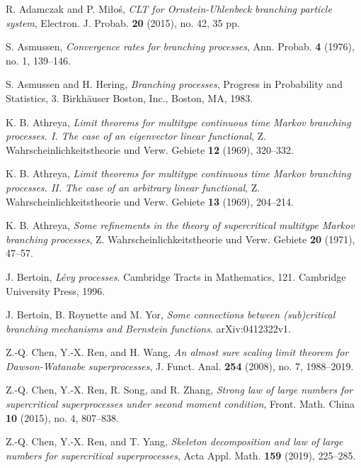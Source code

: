 \documentclass[EJP]{ejpecp} %
\begin{document}
\begin{thebibliography}{10}

  	R. Adamczak and P. Mi{\l}o\'{s}, 
  	\emph{C{LT} for {O}rnstein-{U}hlenbeck branching particle system},
  	Electron. J. Probab. \textbf{20} (2015), no. 42, 35 pp.

  	S. Asmussen, 
  	\emph{Convergence rates for branching processes},
  	Ann. Probab.  \textbf{4} (1976), no. 1, 139--146.

  	S. Asmussen and H. Hering, 
  	\emph{Branching processes},
  	Progress in Probability and Statistics, 3. Birkh\"{a}user Boston, Inc., Boston, MA, 1983.

  	K. B. Athreya,
  	\emph{Limit theorems for multitype continuous time {M}arkov branching processes. {I}. {T}he case of an eigenvector linear functional},
  	Z. Wahrscheinlichkeitstheorie und Verw. Gebiete \textbf{12} (1969), 320--332.

  	K. B. Athreya,
  	\emph{Limit theorems for multitype continuous time {M}arkov branching processes. {II}. {T}he case of an arbitrary linear functional},
  	Z. Wahrscheinlichkeitstheorie und Verw. Gebiete \textbf{13} (1969), 204--214.

  	K. B. Athreya,
  	\emph{Some refinements in the theory of supercritical multitype {M}arkov branching processes},
  	Z. Wahrscheinlichkeitstheorie und Verw. Gebiete \textbf{20} (1971), 47--57.


	J. Bertoin,
	\emph{L\'evy processes}.
	Cambridge Tracts in Mathematics, 121. Cambridge
	University Press, 1996.

	J. Bertoin, B. Roynette and M. Yor,
	\emph{Some connections between (sub)critical branching mechanisms and Bernstein functions}.
	arXiv:0412322v1.


	Z.-Q. Chen, Y.-X. Ren, and H. Wang,
  	\emph{An almost sure scaling limit theorem for {D}awson-{W}atanabe superprocesses},
  	J. Funct. Anal. \textbf{254} (2008), no. 7, 1988--2019.

   	Z.-Q. Chen, Y.-X. Ren, R. Song, and R. Zhang,
   	\emph{Strong law of large numbers for supercritical superprocesses under second moment condition},
   	Front. Math. China \textbf{10} (2015), no. 4, 807--838.

  	Z.-Q. Chen, Y.-X. Ren, and T. Yang,
   	\emph{Skeleton decomposition and law of large numbers for supercritical superprocesses},
   	Acta Appl. Math. \textbf{159} (2019), 225--285.


\end{thebibliography}
\end{document}
